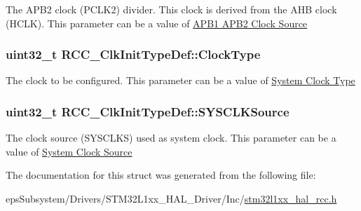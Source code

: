 The A\-P\-B2 clock (P\-C\-L\-K2) divider. This clock is derived from the A\-H\-B clock (H\-C\-L\-K). This parameter can be a value of \hyperlink{group___r_c_c___a_p_b1___a_p_b2___clock___source}{A\-P\-B1 A\-P\-B2 Clock Source} \hypertarget{struct_r_c_c___clk_init_type_def_a93a53676a1cfc5b55b8b990e7ff4dac5}{
\subsubsection[{Clock\-Type}]{\setlength{\rightskip}{0pt plus 5cm}uint32\-\_\-t R\-C\-C\-\_\-\-Clk\-Init\-Type\-Def\-::\-Clock\-Type}}\label{struct_r_c_c___clk_init_type_def_a93a53676a1cfc5b55b8b990e7ff4dac5}
The clock to be configured. This parameter can be a value of \hyperlink{group___r_c_c___system___clock___type}{System Clock Type} \hypertarget{struct_r_c_c___clk_init_type_def_a4ceff1fdbf423e347c63052ca2c1d7e1}{
\subsubsection[{S\-Y\-S\-C\-L\-K\-Source}]{\setlength{\rightskip}{0pt plus 5cm}uint32\-\_\-t R\-C\-C\-\_\-\-Clk\-Init\-Type\-Def\-::\-S\-Y\-S\-C\-L\-K\-Source}}\label{struct_r_c_c___clk_init_type_def_a4ceff1fdbf423e347c63052ca2c1d7e1}
The clock source (S\-Y\-S\-C\-L\-K\-S) used as system clock. This parameter can be a value of \hyperlink{group___r_c_c___system___clock___source}{System Clock Source} 

The documentation for this struct was generated from the following file\-:\begin{DoxyCompactItemize}
\item 
eps\-Subsystem/\-Drivers/\-S\-T\-M32\-L1xx\-\_\-\-H\-A\-L\-\_\-\-Driver/\-Inc/\hyperlink{stm32l1xx__hal__rcc_8h}{stm32l1xx\-\_\-hal\-\_\-rcc.\-h}\end{DoxyCompactItemize}
